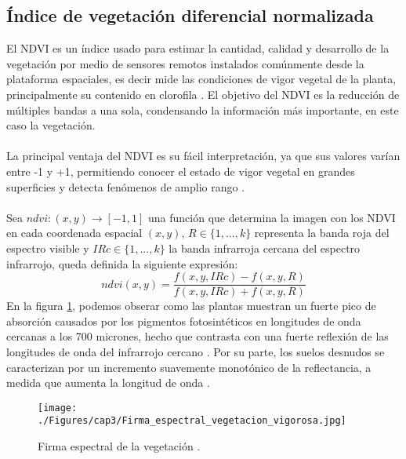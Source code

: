 \subsection{\'Indice de vegetaci\'on diferencial normalizada}\label{subsec:ndvi}
El NDVI es un \'indice usado para estimar la cantidad, calidad y desarrollo de la vegetaci\'on por medio de sensores remotos instalados com\'unmente desde la plataforma espaciales, es decir mide las condiciones de vigor vegetal de la planta, principalmente su contenido en clorofila \cite{salinero2002teledeteccion}. El objetivo del NDVI es la reducci\'on de m\'ultiples bandas a una sola, condensando la informaci\'on m\'as importante, en este caso la vegetaci\'on.\\~\\
La principal ventaja del NDVI es su f\'acil interpretaci\'on, ya que sus valores var\'ian entre -1 y +1, permitiendo conocer el estado de vigor vegetal en grandes superficies y detecta fen\'omenos de amplio rango \cite{salinero2002teledeteccion}.\\~\\
Sea $ ndvi:(x,y) \longrightarrow [-1,1] $ una funci\'on que determina la imagen con los NDVI en cada coordenada espacial $ (x,y) $, $ R \in \{1,...,k\}$ representa la banda roja del espectro visible y $ IRc \in \{1,...,k\}$ la banda infrarroja cercana del espectro infrarrojo, queda definida la siguiente expresi\'on:
	\begin{equation}
	\label{e:ndvi}
	ndvi(x,y)=\dfrac{f(x,y,IRc)-f(x,y,R)}{f(x,y,IRc)+f(x,y,R)}
	\end{equation}
En la figura \ref{fig:firmaVegetacion}, podemos obserar como las plantas muestran un fuerte pico de absorci\'on causados por los pigmentos fotosint\'eticos en longitudes de onda cercanas a los 700 micrones, hecho que contrasta con una fuerte reflexi\'on de las longitudes de onda del infrarrojo cercano \cite{salinero2002teledeteccion}. Por su parte, los suelos desnudos se caracterizan por un incremento suavemente monot\'onico de la reflectancia, a medida que aumenta la longitud de onda \cite{salinero2002teledeteccion}.

  \begin{figure}[H]
  	\centering
  	\texttt{[image: ./Figures/cap3/Firma\_espectral\_vegetacion\_vigorosa.jpg]}
  	\caption{Firma espectral de la vegetaci\'on \cite{ndvi2015com}.}
  	\label{fig:firmaVegetacion}
  \end{figure}


